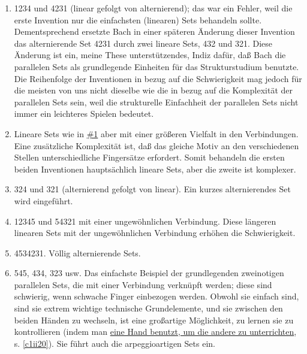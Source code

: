 \begin{enumerate}[label={\arabic*.}] 

\item \label{c1iii20ps01}

1234 und 4231 (linear gefolgt von alternierend); das war ein Fehler, weil die erste Invention nur die einfachsten (linearen) Sets behandeln sollte.
Dementsprechend ersetzte Bach in einer späteren Änderung dieser Invention das alternierende Set 4231 durch zwei lineare Sets, 432 und 321.
Diese Änderung ist ein, meine These unterstützendes, Indiz dafür, daß Bach die parallelen Sets als grundlegende Einheiten für das Strukturstudium benutzte.
Die Reihenfolge der Inventionen in bezug auf die Schwierigkeit mag jedoch für die meisten von uns nicht dieselbe wie die in bezug auf die Komplexität der parallelen Sets sein, weil die strukturelle Einfachheit der parallelen Sets nicht immer ein leichteres Spielen bedeutet.


\item \label{c1iii20ps02}

Lineare Sets wie in \hyperref[c1iii20ps01]{\#1} aber mit einer größeren Vielfalt in den Verbindungen.
Eine zusätzliche Komplexität ist, daß das gleiche Motiv an den verschiedenen Stellen unterschiedliche Fingersätze erfordert.
Somit behandeln die ersten beiden Inventionen hauptsächlich lineare Sets, aber die zweite ist komplexer.


\item \label{c1iii20ps03}

324 und 321 (alternierend gefolgt von linear).
Ein kurzes alternierendes Set wird eingeführt.


\item \label{c1iii20ps04}

12345 und 54321 mit einer ungewöhnlichen Verbindung.
Diese längeren linearen Sets mit der ungewöhnlichen Verbindung erhöhen die Schwierigkeit.


\item \label{c1iii20ps05}

4534231.
Völlig alternierende Sets.


\item \label{c1iii20ps06}

545, 434, 323 usw.
Das einfachste Beispiel der grundlegenden zweinotigen parallelen Sets, die mit einer Verbindung verknüpft werden; diese sind schwierig, wenn schwache Finger einbezogen werden.
Obwohl sie einfach sind, sind sie extrem wichtige technische Grundelemente, und sie zwischen den beiden Händen zu wechseln, ist eine großartige Möglichkeit, zu lernen sie zu kontrollieren (indem man \hyperref[c1ii20]{eine Hand benutzt, um die andere zu unterrichten}, s. \autoref{c1ii20}).
Sie führt auch die arpeggioartigen Sets ein.



\end{enumerate}
